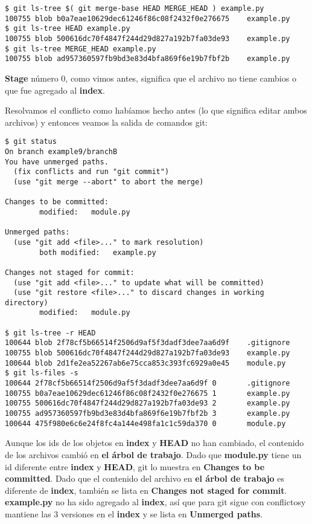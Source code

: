 \begin{lstlisting}[style=console_style,
	basicstyle=\small,
	caption=Verificando los ids de {\bf example.py} en las diferentes versiones]
$ git ls-tree $( git merge-base HEAD MERGE_HEAD ) example.py
100755 blob b0a7eae10629dec61246f86c08f2432f0e276675    example.py
$ git ls-tree HEAD example.py
100755 blob 500616dc70f4847f244d29d827a192b7fa03de93    example.py
$ git ls-tree MERGE_HEAD example.py
100755 blob ad957360597fb9bd3e83d4bfa869f6e19b7fbf2b    example.py
\end{lstlisting}

{\bf Stage} número 0, como vimos antes, significa que el archivo no tiene cambios o que fue agregado al {\bf index}.

Resolvamos el conflicto como habíamos hecho antes (lo que significa editar ambos archivos) y entonces veamos la
salida de comandos git:

\begin{lstlisting}[style=console_style,
	basicstyle=\small,
	caption={\bf git status} luego de modificar los archivos]
$ git status
On branch example9/branchB
You have unmerged paths.
  (fix conflicts and run "git commit")
  (use "git merge --abort" to abort the merge)

Changes to be committed:
        modified:   module.py

Unmerged paths:
  (use "git add <file>..." to mark resolution)
        both modified:   example.py

Changes not staged for commit:
  (use "git add <file>..." to update what will be committed)
  (use "git restore <file>..." to discard changes in working directory)
        modified:   module.py

$ git ls-tree -r HEAD
100644 blob 2f78cf5b66514f2506d9af5f3dadf3dee7aa6d9f    .gitignore
100755 blob 500616dc70f4847f244d29d827a192b7fa03de93    example.py
100644 blob 2d1fe2ea52267ab6e75cca853c393fc6929a0e45    module.py
$ git ls-files -s
100644 2f78cf5b66514f2506d9af5f3dadf3dee7aa6d9f 0       .gitignore
100755 b0a7eae10629dec61246f86c08f2432f0e276675 1       example.py
100755 500616dc70f4847f244d29d827a192b7fa03de93 2       example.py
100755 ad957360597fb9bd3e83d4bfa869f6e19b7fbf2b 3       example.py
100644 475f980e6c6e24f8fc4a144e498fa1c1c59da370 0       module.py
\end{lstlisting}

Aunque los ids de los objetos en {\bf index} y {\bf HEAD} no han cambiado, el contenido de los archivos cambió en
{\bf el árbol de trabajo}. Dado que {\bf module.py} tiene un id diferente entre {\bf index} y {\bf HEAD}, git lo muestra
en {\bf Changes to be committed}. Dado que el contenido del archivo en {\bf el árbol de trabajo} es diferente de {\bf index},
también se lista en {\bf Changes not staged for commit}. {\bf example.py} no ha sido agregado al {\bf index}, así que
para git sigue con conflictosy mantiene las 3 versiones en el {\bf index} y se lista en {\bf Unmerged paths}.


